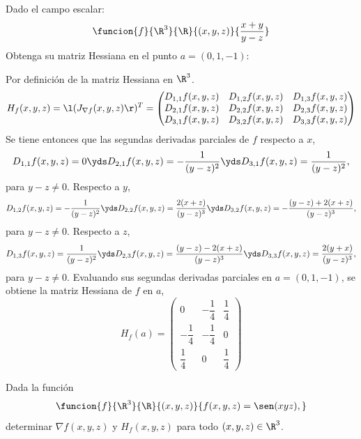 \documentclass[a4,11pt]{aleph-examen}
\begin{document}
\begin{preguntas}
\begin{respuesta}
\begin{respuesta}
\item
Dado el campo escalar:
    \[
        \funcion{f}{\R^3}{\R}{(x,y,z)}{\dfrac{x+y}{y-z}}
    \]
Obtenga su matriz Hessiana en el punto $a=(0,1,-1)$:
\begin{respuesta}
    Por definición de la matriz Hessiana en $\R^3$.
    \[
        H_f(x,y,z)=\l(J_{\nabla f}(x,y,z)\r)^T= \begin{pmatrix}
        D_{1,1}f(x,y,z) & D_{1,2}f(x,y,z) & D_{1,3}f(x,y,z)\\
        D_{2,1}f(x,y,z) & D_{2,2}f(x,y,z) & D_{2,3}f(x,y,z)\\
        D_{3,1}f(x,y,z) & D_{3,2}f(x,y,z) & D_{3,3}f(x,y,z)
        \end{pmatrix}
    \]
Se tiene entonces que las segundas derivadas parciales de $f$ respecto a $x$,
    \[
        D_{1,1}f(x,y,z)=0
        \yds
        D_{2,1}f(x,y,z)=-\dfrac{1}{(y-z)^2}
        \yds
        D_{3,1}f(x,y,z)=\dfrac{1}{(y-z)^2},
    \]
para $y-z \neq 0$. Respecto a $y$,
    \[
        D_{1,2}f(x,y,z)=-\dfrac{1}{(y-z)^2}
        \yds
        D_{2,2}f(x,y,z)=\dfrac{2(x+z)}{(y-z)^3}
        \yds
        D_{3,2}f(x,y,z)=-\dfrac{(y-z)+2(x+z)}{(y-z)^3},
    \]
para $y-z \neq 0$. Respecto a $z$,
    \[
        D_{1,3}f(x,y,z)=\dfrac{1}{(y-z)^2}
        \yds
        D_{2,3}f(x,y,z)=\dfrac{(y-z)-2(x+z)}{(y-z)^3}
        \yds
        D_{3,3}f(x,y,z)=\dfrac{2(y+x)}{(y-z)^3},
    \]
para $y-z \neq 0$. Evaluando sus segundas derivadas parciales en $a=(0,1,-1)$, se obtiene la matriz Hessiana de $f$ en $a$,
    \[
        H_f(a)= \begin{pmatrix}
        0 & -\dfrac{1}{4} & \dfrac{1}{4}\\
        -\dfrac{1}{4} & -\dfrac{1}{4} & 0\\
        \dfrac{1}{4} & 0 & \dfrac{1}{4}
        \end{pmatrix}
    \]
\end{respuesta}

\item  
    Dada la función
    \[
        \funcion{f}{\R^3}{\R}{(x,y,z)}{f(x,y,z)=\sen(xyz),}
    \]
    determinar $\nabla f(x,y,z)$ y $H_f(x,y,z)$ para todo $(x,y,z)\in\R^3$.


\end{respuesta}
\end{respuesta}
\end{preguntas}
\end{document}
